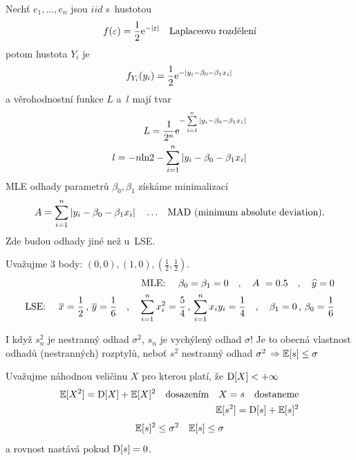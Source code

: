 \begin{example}
Nechť $ e_{1}, \dots , e_{n} $ jsou $iid$ s~hustotou
\begin{equation*}
  f(\varepsilon) = \frac{1}{2} \mathrm{e}^{- \vert \varepsilon \vert} \quad \text{Laplaceovo rozdělení}
\end{equation*}
potom hustota $ Y_{i} $ je 
\begin{equation*}
  f_{Y_{i}}(y_{i}) = \frac{1}{2} \mathrm{e}^{- \vert y_{i} - \beta_{0} - \beta_{1} x_{i} \vert} 
\end{equation*}
a věrohodnostní funkce $ L $ a~$  l$ mají tvar
\begin{equation*}
\begin{aligned}
  L = \frac{1}{2^{n}} \mathrm{e}^{- \sum\limits_{i=1}^{n} \vert y_{i} - \beta_{0} - \beta_{1} x_{i} \vert}  \\
  l = -n \text{ln} 2 - \sum\limits_{i=1}^{n} \vert y_{i} - \beta_{0} - \beta_{1} x_{i} \vert 
\end{aligned} 
\end{equation*}
MLE odhady parametrů $ \beta_{0} , \beta_{1} $ získáme minimalizací
$$
A = \sum\limits_{i=1}^{n} \vert y_{i} - \beta_{0} - \beta_{1} x_{i} \vert \quad \dots \text{ \, MAD (minimum absolute deviation).}
$$
Zde budou odhady jiné než u~LSE.

Uvažujme 3 body: $ (0,0) , (1,0) , (\frac{1}{2},\frac{1}{2}) $.
$$
\begin{aligned}
\text{MLE: } \quad  \beta_{0} = \beta_{1} = 0 \quad , \quad A~= 0.5
 \quad , \quad \widehat{y} = 0 \\
 \text{LSE: } \quad \overline{x} = \frac{1}{2} \, , \, \overline{y} = \frac{1}{6} \quad , \quad \sum\limits_{i=1}^{n} x_{i}^{2} = \frac{5}{4} \, , \, \sum\limits_{i=1}^{n} x_{i} y_{i} = \frac{1}{4} \quad , \quad \beta_{1} = 0 \, , \, \beta_{0} = \frac{1}{6}
  \end{aligned}  
$$
\end{example}

\begin{remark}
I když $ s^{2}_{n} $ je nestranný odhad $ \sigma^{2} $, $ s_{n} $ je vychýlený odhad $ \sigma $!
Je to obecná vlastnost odhadů (nestranných) rozptylů, neboť $ s^{2} $ nestranný odhad $ \sigma^{2} \, \Rightarrow \mathbb{E}[s] \leq \sigma $ 
\end{remark}


Uvažujme náhodnou veličinu $ X $  pro kterou platí, že $ \mathrm{D} [ X ] < + \infty $
\begin{equation*}
\begin{aligned}
 \mathbb{E} [X^{2}] = \mathrm{D} [ X ] +  \mathbb{E} [X]^{2} \quad \text{dosazením} \quad X = s \quad \text{dostaneme} \\
  \mathbb{E} [s^{2}] = \mathrm{D} [ s ] +  \mathbb{E} [s]^{2}
 \end{aligned} 
\end{equation*}
\begin{equation}
\mathbb{E} [s]^{2} \leq \sigma^{2} \quad \mathbb{E} [s] \leq \sigma
\end{equation}
a rovnost nastává pokud $ \mathrm{D} [ s ] = 0 $.

